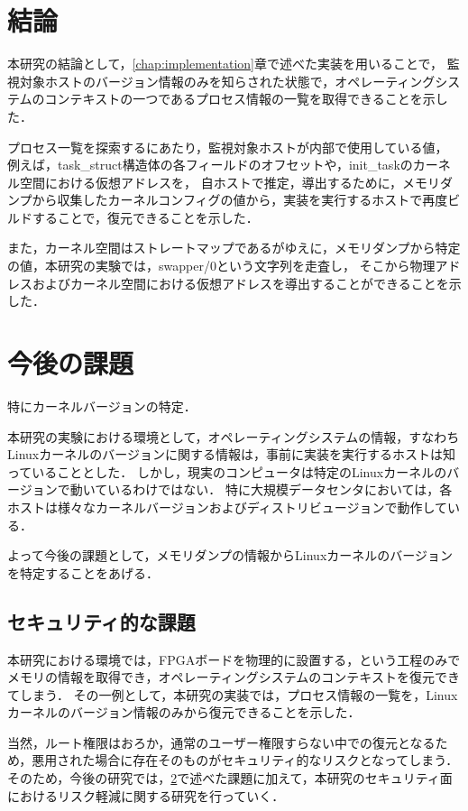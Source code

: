 \section{結論}

本研究の結論として，\ref{chap:implementation}章で述べた実装を用いることで，
監視対象ホストのバージョン情報のみを知らされた状態で，オペレーティングシステムのコンテキストの一つであるプロセス情報の一覧を取得できることを示した．

プロセス一覧を探索するにあたり，監視対象ホストが内部で使用している値，
例えば，task\_struct構造体の各フィールドのオフセットや，init\_taskのカーネル空間における仮想アドレスを，
自ホストで推定，導出するために，メモリダンプから収集したカーネルコンフィグの値から，実装を実行するホストで再度ビルドすることで，復元できることを示した．

また，カーネル空間はストレートマップであるがゆえに，メモリダンプから特定の値，本研究の実験では，swapper/0という文字列を走査し，
そこから物理アドレスおよびカーネル空間における仮想アドレスを導出することができることを示した．



\section{今後の課題}
\label{section:kongo}

特にカーネルバージョンの特定．

本研究の実験における環境として，オペレーティングシステムの情報，すなわちLinuxカーネルのバージョンに関する情報は，事前に実装を実行するホストは知っていることとした．
しかし，現実のコンピュータは特定のLinuxカーネルのバージョンで動いているわけではない．
特に大規模データセンタにおいては，各ホストは様々なカーネルバージョンおよびディストリビュージョンで動作している．

よって今後の課題として，メモリダンプの情報からLinuxカーネルのバージョンを特定することをあげる．

\subsection{セキュリティ的な課題}

本研究における環境では，FPGAボードを物理的に設置する，という工程のみでメモリの情報を取得でき，オペレーティングシステムのコンテキストを復元できてしまう．
その一例として，本研究の実装では，プロセス情報の一覧を，Linuxカーネルのバージョン情報のみから復元できることを示した．

当然，ルート権限はおろか，通常のユーザー権限すらない中での復元となるため，悪用された場合に存在そのものがセキュリティ的なリスクとなってしまう．
そのため，今後の研究では，\ref{section:kongo}で述べた課題に加えて，本研究のセキュリティ面におけるリスク軽減に関する研究を行っていく．
